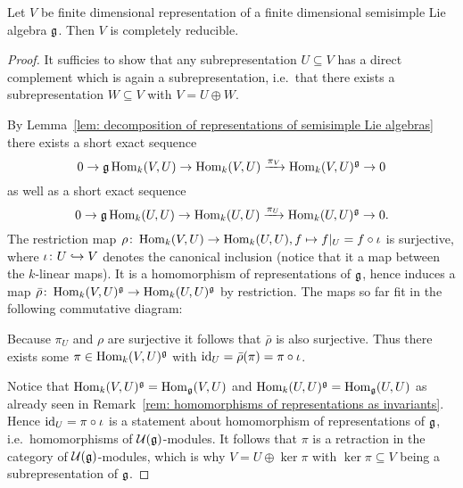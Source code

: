 \begin{thrm}[Weyl]
 Let $V$ be finite dimensional representation of a finite dimensional semisimple Lie algebra $\mathfrak{g}$. Then $V$ is completely reducible.
\end{thrm}
\begin{proof}
 It sufficies to show that any subrepresentation $U \subseteq V$ has a direct complement which is again a subrepresentation, i.e.\ that there exists a subrepresentation $W \subseteq V$ with $V = U \oplus W$.
 
 By Lemma~\ref{lem: decomposition of representations of semisimple Lie algebras} there exists a short exact sequence
 \[
  0 \to \mathfrak{g} \operatorname{Hom}_k(V, U) \to \operatorname{Hom}_k(V,U) \xrightarrow{\pi_V} \operatorname{Hom}_k(V,U)^{\mathfrak{g}} \to 0
 \]
 as well as a short exact sequence
 \[
  0 \to \mathfrak{g} \operatorname{Hom}_k(U, U) \to \operatorname{Hom}_k(U,U) \xrightarrow{\pi_U} \operatorname{Hom}_k(U,U)^{\mathfrak{g}} \to 0.
 \]
 The restriction map $\rho \colon \operatorname{Hom}_k(V,U) \to \operatorname{Hom}_k(U,U), f \mapsto f|_{U} = f \circ \iota$ is surjective, where $\iota \colon U \hookrightarrow V$ denotes the canonical inclusion (notice that it a map between the $k$-linear maps). It is a homomorphism of representations of $\mathfrak{g}$, hence induces a map $\bar{\rho} \colon \operatorname{Hom}_k(V,U)^{\mathfrak{g}} \to \operatorname{Hom}_k(U,U)^{\mathfrak{g}}$ by restriction. The maps so far fit in the following commutative diagram:
 \begin{center}
 \end{center}
 Because $\pi_U$ and $\rho$ are surjective it follows that $\bar{\rho}$ is also surjective. Thus there exists some $\pi \in \operatorname{Hom}_k(V,U)^{\mathfrak{g}}$ with $\operatorname{id}_U = \bar{\rho}(\pi) = \pi \circ \iota$.
 
 Notice that $\operatorname{Hom}_k(V,U)^{\mathfrak{g}} = \operatorname{Hom}_{\mathfrak{g}}(V,U)$ and $\operatorname{Hom}_k(U,U)^{\mathfrak{g}} = \operatorname{Hom}_{\mathfrak{g}}(U,U)$ as already seen in Remark~\ref{rem: homomorphisms of representations as invariants}. Hence $\operatorname{id}_U = \pi \circ \iota$ is a statement about homomorphism of representations of $\mathfrak{g}$, i.e.\ homomorphisms of $\mathcal{U}(\mathfrak{g})$-modules. It follows that $\pi$ is a retraction in the category of $\mathcal{U}(\mathfrak{g})$-modules, which is why $V = U \oplus \ker \pi$ with $\ker \pi \subseteq V$ being a subrepresentation of $\mathfrak{g}$.
\end{proof}


